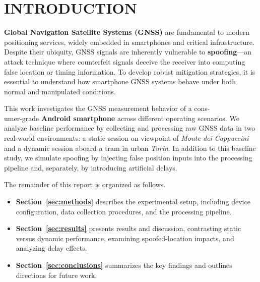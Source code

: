 
\section{INTRODUCTION} \label{sec:introduction}

    \textbf{Global Navigation Satellite Systems (GNSS)} are fundamental to modern positioning services, widely embedded in smartphones and critical infrastructure. 
    Despite their ubiquity, GNSS signals are inherently vulnerable to \textbf{spoofing}—an attack technique where counterfeit signals deceive the receiver into computing false location or timing information. 
    To develop robust mitigation strategies, it is essential to understand how smartphone GNSS systems behave under both normal and manipulated conditions.

    \noindent This work investigates the GNSS measurement behavior of a cons-\\umer-grade \textbf{Android smartphone} across different operating scenarios. 
    We analyze baseline performance by collecting and processing raw GNSS data in two real-world environments: a static session on viewpoint of \textit{Monte dei Cappuccini} and a dynamic session aboard a tram in urban \textit{Turin}. 
    In addition to this baseline study, we simulate spoofing by injecting false position inputs into the processing pipeline and, separately, by introducing artificial delays.

    \noindent The remainder of this report is organized as follows.
    
    \begin{itemize}
        \item \textbf{Section~\ref{sec:methods}} describes the experimental setup, including device configuration, data collection procedures, and the processing pipeline.
        \item \textbf{Section~\ref{sec:results}} presents results and discussion, contrasting static versus dynamic performance, examining spoofed-location impacts, and analyzing delay effects.
        \item \textbf{Section~\ref{sec:conclusions}} summarizes the key findings and outlines directions for future work.
    \end{itemize}
